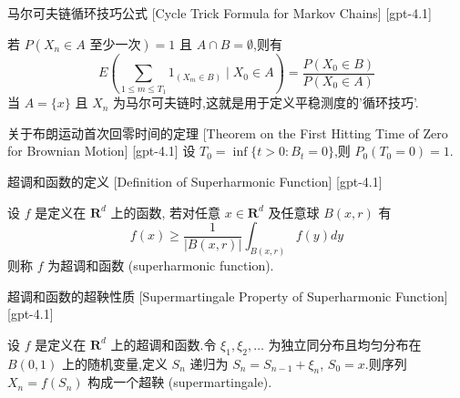 \documentclass[UTF8]{ctexart}
\begin{document}
    
    
    \begin{thm}
        {马尔可夫链循环技巧公式}
        [Cycle Trick Formula for Markov Chains]
        [gpt-4.1]
        
若 $P ( X _ { n } \in A \text{ 至少一次} ) = 1$ 且 $A \cap B = \emptyset$,则有
\[
E \left( \sum_{1 \leq m \leq T_{1}} 1_{( X_{m} \in B )} \mid X_{0} \in A \right) = \frac{P( X_{0} \in B )}{P( X_{0} \in A )}
\]
当 $A = \{ x \}$ 且 $X_{n}$ 为马尔可夫链时,这就是用于定义平稳测度的'循环技巧'.

    \end{thm}
    
    
    
    \begin{thm}
        {关于布朗运动首次回零时间的定理}
        [Theorem on the First Hitting Time of Zero for Brownian Motion]
        [gpt-4.1]
        设 $T_{0} = \operatorname*{inf}\{ t > 0 : B_{t} = 0 \}$,则 $P_{0}(T_{0} = 0) = 1$.
    \end{thm}
    
    
    
    \begin{dfn}
        {超调和函数的定义}
        [Definition of Superharmonic Function]
        [gpt-4.1]
        
设 $f$ 是定义在 $\mathbf{R}^d$ 上的函数, 若对任意 $x \in \mathbf{R}^d$ 及任意球 $B(x, r)$ 有
\[
f(x) \geq \frac{1}{|B(x, r)|} \int_{B(x, r)} f(y) dy
\]
则称 $f$ 为超调和函数 (superharmonic function).

    \end{dfn}
    
    
    
    \begin{thm}
        {超调和函数的超鞅性质}
        [Supermartingale Property of Superharmonic Function]
        [gpt-4.1]
        
设 $f$ 是定义在 $\mathbf{R}^{d}$ 上的超调和函数.令 $\xi_{1}, \xi_{2}, \ldots$ 为独立同分布且均匀分布在 $B(0,1)$ 上的随机变量,定义 $S_{n}$ 递归为 $S_{n} = S_{n-1} + \xi_{n}$, $S_{0} = x$.则序列 $X_{n} = f(S_{n})$ 构成一个超鞅 (supermartingale).

    \end{thm}
    
    
    
\end{document}
